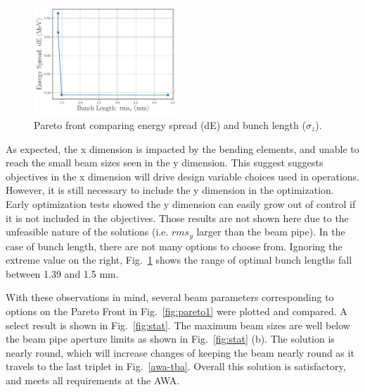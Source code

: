  
\begin{figure}
	\centering
	\includegraphics[width=0.48\textwidth]{../pareto_stat_plots/dE_vs_zrms_pareto_front_quads_before_Q5_zoomout}%
	\caption{Pareto front comparing energy spread (dE) and bunch length ($\sigma_z$). }
	\label{fig:pareto2}
\end{figure}  


As expected, the x dimension is impacted by the bending elements, and unable to reach 
the small beam sizes seen in the y dimension. This suggest suggests objectives in the x 
dimension will drive design variable choices used in operations. 
However, it is still necessary to 
include the y dimension in the optimization. Early optimization tests showed the y dimension 
can easily grow out of control if it is not included in the objectives.
Those results are not shown here due to the unfeasible nature of the solutions 
(i.e. $rms_y$ larger than the beam pipe).
In the case of bunch length, there are not many options to choose from.
Ignoring the extreme value on the right, Fig.~\ref{fig:pareto2} shows the 
range of optimal bunch lengths fall between 1.39 and 1.5 mm.

With these observations in mind, several beam parameters corresponding to
options on the Pareto Front in Fig.~\ref{fig:pareto1} were plotted and compared. 
A select result is shown in Fig.~\ref{fig:stat}.  
The maximum beam sizes are well below the beam pipe aperture limits as shown in Fig.~\ref{fig:stat} (b).
The solution is nearly round, which will increase changes of keeping the beam nearly round
as it travels to the last triplet in Fig.~\ref{awa-tba}.
Overall this solution is satisfactory, and meets all requirements at the AWA.

